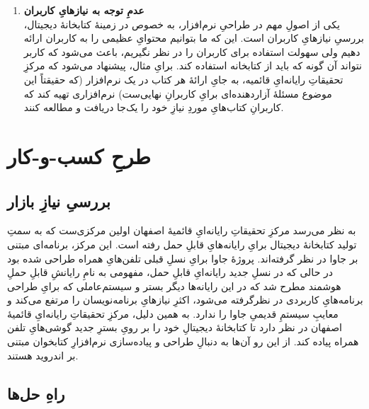 \documentclass[]{article}
\begin{document}
\begin{enumerate}
\item \textbf{عدمِ توجه به نیازهایِ کاربران}\\
یکی از اصولِ مهم در طراحیِ نرم‌افزار، به خصوص در زمینهٔ کتابخانهٔ دیجیتال، بررسیِ نیازهایِ کاربران است. این که ما بتوانیم محتوایِ عظیمی را به کاربران ارائه دهیم ولی سهولت استفاده برای کاربران را در نظر نگیریم، باعث می‌شود که کاربر نتواند آن گونه که باید از کتابخانه استفاده کند. برایِ مثال، پیشنهاد می‌شود که مرکزِ تحقیقاتِ رایانه‌ایِ قائمیه، به جایِ ارائهٔ هر کتاب در یک نرم‌افزار (که حقیقتاً این موضوع مسئلهٔ آزاردهنده‌ای برایِ کاربرانِ نهایی‌ست) نرم‌افزاری تهیه کند که کاربرانِ کتاب‌هایِ موردِ نیازِ خود را یک‌جا دریافت و مطالعه کنند.

\end{enumerate}


\section{طرحِ کسب-و-کار}
\subsection{بررسیِ نیازِ بازار}
به نظر می‌رسد مرکزِ تحقیقاتِ رایانه‌ایِ قائمیهٔ اصفهان اولین مرکزی‌ست که به سمتِ تولید کتابخانهٔ‌ دیجیتال برایِ رایانه‌هایِ قابلِ حمل رفته است. این مرکز، برنامه‌ای مبتنی بر جاوا در نظر گرفته‌اند. پروژهٔ جاوا برایِ نسلِ قبلی تلفن‌هایِ همراه طراحی شده بود در حالی که در نسلِ جدید رایانه‌ایِ قابلِ حمل، مفهومی به نامِ رایانشِ قابلِ حملِ هوشمند مطرح شد که در این رایانه‌ها دیگر بستر و سیستم‌عاملی که برایِ طراحی برنامه‌هایِ کاربردی در نظرگرفته می‌شود، اکثرِ نیازهایِ برنامه‌نویسان را مرتفع می‌کند و معایبِ سیستمِ قدیمیِ جاوا را ندارد. به همین دلیل، مرکزِ تحقیقاتِ رایانه‌ایِ قائمیهٔ اصفهان در نظر دارد تا کتابخانهٔ دیجیتالِ خود را بر رویِ بسترِ جدید گوشی‌هایِ تلفن همراه پیاده کند. از این رو آن‌ها به دنبالِ طراحی و پیاده‌سازی نرم‌افزارِ کتابخوان مبتنی بر اندروید هستند.
\subsection{راهِ حل‌ها}
\end{document}
